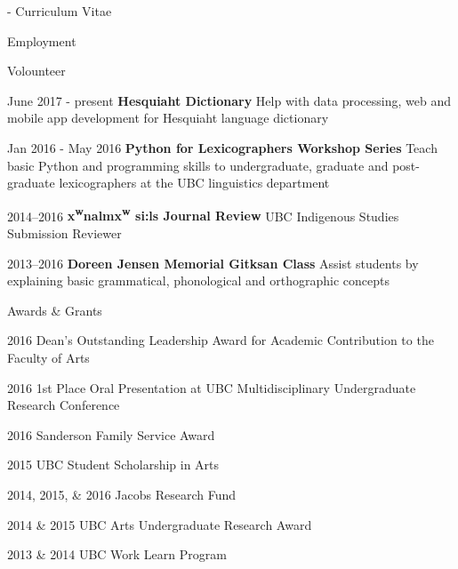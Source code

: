 \documentclass[12pt]{letter}
\begin{document}
\begin{cv}{     \space - \space   Curriculum Vitae}
\begin{cvlist}{Employment}
        \end{cvlist}
        \begin{cvlist}{Volounteer}
            \item[June 2017 - present] \textbf{Hesquiaht Dictionary}
            \newline Help with data processing, web and mobile app development for Hesquiaht language dictionary
            \item[Jan 2016 - May 2016] \textbf{Python for Lexicographers Workshop Series}
            \newline Teach basic Python and programming skills to undergraduate, graduate and post-graduate lexicographers at the UBC linguistics department
            \item[2014--2016] \textbf{x\textsuperscript{w}na\textglotstop\textschwa l\textschwa mx\textsuperscript{w} s\textchi\textschwa\textchi i:ls Journal Review} 
            \newline UBC Indigenous Studies Submission Reviewer
            
            \item[2013--2016] \textbf{Doreen Jensen Memorial Gitksan Class}
            \newline Assist students by explaining basic grammatical, phonological and orthographic concepts
        \end{cvlist}
        \begin{cvlist}{Awards \& Grants}
            \item[2016] Dean's Outstanding Leadership Award for Academic Contribution to the Faculty of Arts
            \item[2016] 1st Place Oral Presentation at UBC Multidisciplinary Undergraduate Research Conference
            \item[2016] Sanderson Family Service Award 
            \item[2015] UBC Student Scholarship in Arts
            \item[2014, 2015, \& 2016]	Jacobs Research Fund
            \item[2014 \& 2015]	UBC Arts Undergraduate Research Award
            \item[2013 \& 2014]	UBC Work Learn Program
        \end{cvlist}
    \end{cv}
    
    
\end{document}
